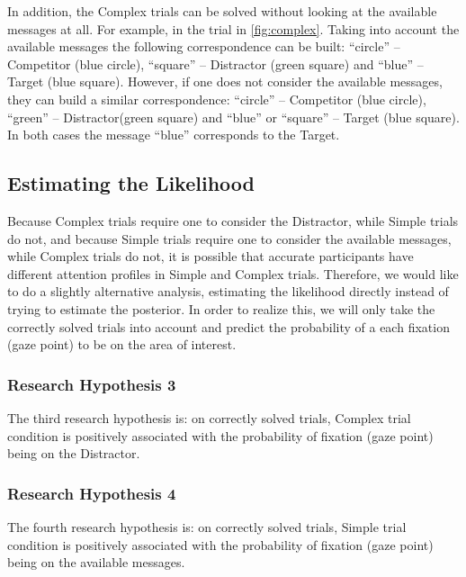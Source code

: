 In addition, the Complex trials can be solved without looking at the available messages at all. For example, in the trial in \autoref{fig:complex}. Taking into account the available messages the following correspondence can be built: ``circle'' -- Competitor (blue circle), ``square'' -- Distractor (green square) and ``blue'' -- Target (blue square). However, if one does not consider the available messages, they can build a similar correspondence: ``circle'' -- Competitor (blue circle), ``green'' -- Distractor(green square) and ``blue'' or ``square'' -- Target (blue square). In both cases the message ``blue'' corresponds to the Target.

\subsection{Estimating the Likelihood}
\label{sec:likelihood}

Because Complex trials require one to consider the Distractor, while Simple trials do not, and because Simple trials require one to consider the available messages, while Complex trials do not, it is possible that accurate participants have different attention profiles in Simple and Complex trials. Therefore, we would like to do a slightly alternative analysis, estimating the likelihood directly instead of trying to estimate the posterior. In order to realize this, we will only take the correctly solved trials into account and predict the probability of a each fixation (gaze point) to be on the area of interest.

\subsubsection{Research Hypothesis 3}
\label{sec:h3}
The third research hypothesis is: on correctly solved trials, Complex trial condition is positively associated with the probability of fixation (gaze point) being on the Distractor. 

\subsubsection{Research Hypothesis 4}
\label{sec:h4}
The fourth research hypothesis is: on correctly solved trials, Simple trial condition is positively associated with the probability of fixation (gaze point) being on the available messages.


